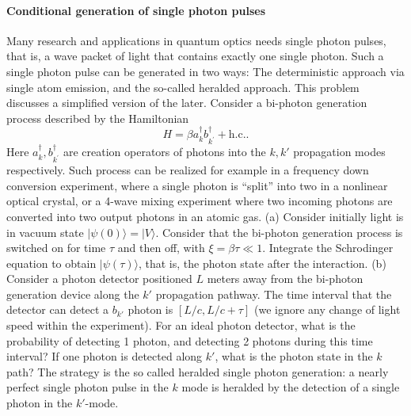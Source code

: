 \documentclass[hyperref, a4paper]{article}
\begin{document}
\paragraph{}

\paragraph{Conditional generation of single photon pulses} Many research and applications in quantum optics needs single photon pulses, that is, a wave packet of light that contains exactly one single photon. Such a single photon pulse can be generated in two ways: The deterministic approach via single atom emission, and the so-called heralded approach. This problem discusses a simplified version of the later.
Consider a bi-photon generation process described by the Hamiltonian  
\begin{equation}
    H=\beta a_{k}^\dagger b_{k^{\prime}}^\dagger+ \text{h.c.}.
\end{equation}
Here $a_{k}^\dagger, b_{k^{\prime}}^\dagger$ are creation operators of photons into the $k, k'$ propagation modes respectively. Such process can be realized for example in a frequency down conversion experiment, where a single photon is ``split'' into two in a nonlinear optical crystal, or a 4-wave mixing experiment where two incoming photons are converted into two output photons in an atomic gas.
(a) Consider initially light is in vacuum state $|\psi(0)\rangle=|V\rangle$. Consider that the bi-photon generation process is switched on for time $\tau$ and then off, with $\xi=\beta \tau \ll 1$. Integrate the Schrodinger equation to obtain $|\psi(\tau)\rangle$, that is, the photon state after the interaction. (b) Consider a photon detector positioned $L$ meters away from the bi-photon generation device along the $k'$ propagation pathway. The time interval that the detector can detect a $b_{k'}$ photon is $[L / c, L / c+\tau]$ (we ignore any change of light speed within the experiment). For an ideal photon detector, what is the probability of detecting 1 photon, and detecting 2 photons during this time interval? If one photon is detected along $k'$, what is the photon state in the $k$ path? The strategy is the so called heralded single photon generation: a nearly perfect single photon pulse in the $k$ mode is heralded by the detection of a single photon in the $k'$-mode.
\end{document}
